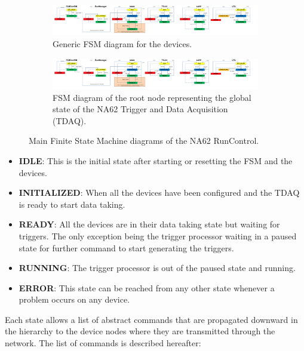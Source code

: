 \documentclass[a4paper]{article}
\begin{document}
\begin{figure}
	\centering
	\begin{subfigure}{0.49\textwidth}
		\includegraphics[page=3,width=1.15\textwidth]{Doc/FullFSM.pdf}
		\caption{Generic FSM diagram for the devices.\newline}
		\label{fig:FSM_Device}
	\end{subfigure}
	\begin{subfigure}{0.49\textwidth}
		\includegraphics[page=2,width=1.15\textwidth]{Doc/FullFSM.pdf}
		\caption{FSM diagram of the root node representing the global state of the
	NA62 Trigger and Data Acquisition (TDAQ).}
		\label{fig:FSM_Main}
	\end{subfigure}
	\caption{Main Finite State Machine diagrams of the NA62 RunControl.}
\end{figure}

\begin{itemize}
	\item \textbf{IDLE}: This is the initial state after starting or resetting the FSM and the devices.
	\item \textbf{INITIALIZED}: When all the devices have been configured and the
	TDAQ is ready to start data taking.
	\item \textbf{READY}: All the devices are in their data taking state but
	waiting for triggers. The only exception being the trigger processor waiting
	in a paused state for further command to start generating the triggers.
	\item \textbf{RUNNING}: The trigger processor is out of the paused state and
	running.
	\item \textbf{ERROR}: This state can be reached from any other state whenever a
	problem occurs on any device.
\end{itemize}

Each state allows a list of abstract commands that are propagated downward in the hierarchy to
the device nodes where they are transmitted through the network. The list of commands is described
hereafter:
\end{document}
